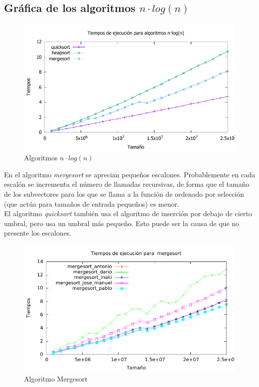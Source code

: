 \documentclass[a4paper, 11pt]{article}
\begin{document}
\newpage
\subsection{Gráfica de los algoritmos $n\cdot log(n)$ }
\begin{figure}[h] \includegraphics[width=14cm]{comparativa_logaritmicos_g} \centering
	\caption{Algoritmos  $n\cdot log(n)$} \end{figure}

En el algoritmo \textit{mergesort} se aprecian pequeños escalones. Probablemente en cada escalón se incrementa el número de llamadas recursivas, de forma que el tamaño de los subvectores para los que se llama a la función de ordenado por selección (que actúa para tamaños de entrada pequeños) es menor. \\
El algoritmo \textit{quicksort} también usa el algoritmo de inserción por debajo de cierto umbral, pero usa un umbral más pequeño. Esto puede ser la causa de que no presente los escalones.

\begin{figure}[h] \includegraphics[width=15cm]{mergesort_todos_g} \centering
   \caption{Algoritmo Mergesort} \end{figure}
\end{document}

